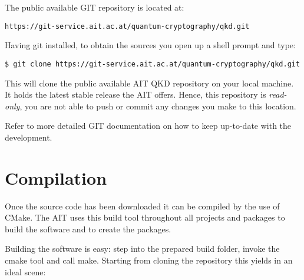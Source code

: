 \medskip

The public available GIT repository is located at:

\begin{center}
\texttt{https://git-service.ait.ac.at/quantum-cryptography/qkd.git}
\end{center}

Having git installed, to obtain the sources you open up a shell prompt and type:

\begin{minipage}{0.9\textwidth}
\bigskip
\begin{verbatim}
$ git clone https://git-service.ait.ac.at/quantum-cryptography/qkd.git
\end{verbatim}
\medskip
\end{minipage}

\medskip

This will clone the public available AIT QKD repository on your local machine. It holds the latest stable release the AIT offers. Hence, this repository is \textit{read-only}, you are not able to push or commit any changes you make to this location. 

\medskip

Refer to more detailed GIT documentation on how to keep up-to-date with the development.


\section{Compilation}
\label{sec:Compilation}

Once the source code has been downloaded it can be compiled by the use of CMake. The AIT uses this build tool throughout all projects and packages to build the software and to create the packages.

\medskip

Building the software is easy: step into the prepared build folder, invoke the cmake tool and call make. Starting from cloning the repository this yields in an ideal scene:

